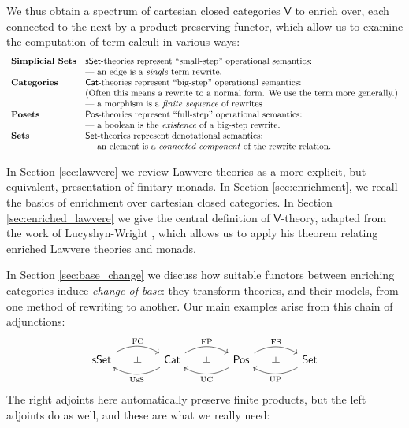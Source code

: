 \documentclass{amsart}
\theoremstyle{definition}
\def\ld{\rotatebox[origin=c]{-90}{$\dashv$}} %
\newcommand{\sSet}{\mathsf{sSet}}
\newcommand{\Set}{\mathsf{Set}}
\newcommand{\Cat}{\mathsf{Cat}}
\newcommand{\Pos}{\mathsf{Pos}}
\newcommand{\V}{\mathsf{V}}
\newcommand{\FC}{\mathrm{FC}}
\newcommand{\FP}{\mathrm{FP}}
\newcommand{\FS}{\mathrm{FS}}
\newcommand{\UC}{\mathrm{UC}}
\newcommand{\UP}{\mathrm{UP}}
\newcommand{\US}{\mathrm{UsS}}
\begin{document}
We thus obtain a spectrum of cartesian closed categories $\V$ to enrich over, each connected to the next by a product-preserving functor, which allow us to examine the computation of term calculi in various ways: \\
\[\begin{array}{lll}
\textbf{Simplicial Sets} & \sSet \text{-theories represent ``small-step'' operational semantics:} \\ & \text{--- an edge is a \textit{single} term rewrite.}\\
\textbf{Categories} & \Cat\text{-theories represent ``big-step'' operational semantics:} \\  & \text{(Often this means a rewrite to a normal form. We use the term more generally.)}\\ & \text{--- a morphism is a \textit{finite sequence} of rewrites.}\\
    \textbf{Posets} & \Pos \text{-theories represent ``full-step'' operational semantics:}\\ & \text{--- a boolean is the \textit{existence} of a big-step rewrite.}\\
\textbf{Sets} & \Set \text{-theories represent denotational semantics:} \\ & \text{--- an element is a \textit{connected component} of the rewrite relation.} 
\end{array}\]

In Section \ref{sec:lawvere} we review Lawvere theories as a more explicit, but equivalent, presentation of finitary monads. In Section \ref{sec:enrichment}, we recall the basics of enrichment over cartesian closed categories.   In Section \ref{sec:enriched_lawvere} we give the central definition of $\V$-theory, adapted from the work of Lucyshyn-Wright \cite{lucyshyn-wright}, which allows us to apply his theorem relating enriched Lawvere theories and monads.

In Section \ref{sec:base_change} we discuss how suitable functors between enriching categories induce \textit{change-of-base}: they transform theories, and their models, from one method of rewriting to another.   Our main examples arise from this chain of adjunctions:
\[\begin{tikzcd}[column sep=small]
\sSet  \arrow[bend left,below]{rr}{\FC}
& \ld &
\arrow[bend left,above]{ll}{\US} 
\Cat \arrow[bend left,below]{rr}{\FP}
& \ld &
\arrow[bend left,above]{ll}{\UC} \Pos \arrow[bend left,below]{rr}{\FS}
& \ld &
\Set \arrow[bend left,above]{ll}{\UP}
\end{tikzcd}\]
The right adjoints here automatically preserve finite products, but the left adjoints do as well, and
these are what we really need:
\end{document}
